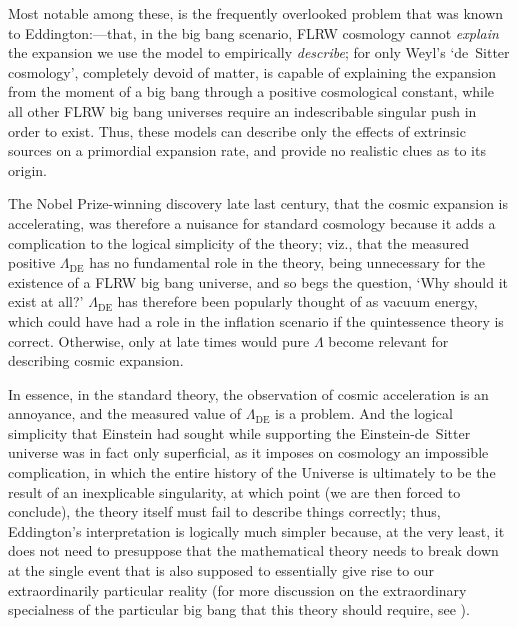Most notable among these, is the frequently overlooked problem that was known to Eddington:---that, in the big bang scenario, FLRW cosmology cannot \textit{explain} the expansion we use the model to empirically \textit{describe}; for only Weyl's `de~Sitter cosmology', completely devoid of matter, is capable of explaining the expansion from the moment of a big bang through a positive cosmological constant, while all other FLRW big bang universes require an indescribable singular push in order to exist. Thus, these models can describe only the effects of extrinsic sources on a primordial expansion rate, and provide no realistic clues as to its origin.

The Nobel Prize-winning discovery late last century, that the cosmic expansion is accelerating, was therefore a nuisance for standard cosmology because it adds a complication to the logical simplicity of the theory; viz., that the measured positive $\Lambda_{\mathrm{DE}}$ has no fundamental role in the theory, being unnecessary for the existence of a FLRW big bang universe, and so begs the question, `Why should it exist at all?' $\Lambda_{\mathrm{DE}}$ has therefore been popularly thought of as vacuum energy, which could have had a role in the inflation scenario if the quintessence theory is correct. Otherwise, only at late times would pure $\Lambda$ become relevant for describing cosmic expansion. 

In essence, in the standard theory, the observation of cosmic acceleration is an annoyance, and the measured value of $\Lambda_{\mathrm{DE}}$ is a problem. And the logical simplicity that Einstein had sought while supporting the Einstein-de~Sitter universe was in fact only superficial, as it imposes on cosmology an impossible complication, in which the entire history of the Universe is ultimately to be the result of an inexplicable singularity, at which point (we are then forced to conclude), the theory itself must fail to describe things correctly; thus, Eddington's interpretation is logically much simpler because, at the very least, it does not need to presuppose that the mathematical theory needs to break down at the single event that is also supposed to essentially give rise to our extraordinarily particular reality (for more discussion on the extraordinary specialness of the particular big bang that this theory should require, see \cite{Penrose2005,Penrose2009}).

